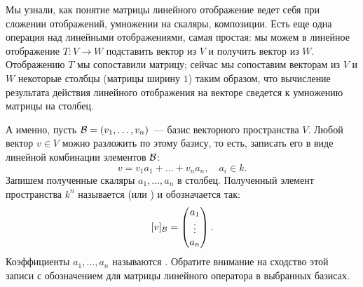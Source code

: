 Мы узнали, как понятие матрицы линейного отображение
ведет себя при сложении отображений, умножении на скаляры,
композиции. Есть еще одна операция над линейными
отображениями, самая простая: мы можем в линейное
отображение $T\colon V\to W$ подставить вектор из
$V$ и получить вектор из $W$.
Отображению $T$ мы сопоставили матрицу; сейчас мы сопоставим
векторам из $V$ и $W$ некоторые столбцы (матрицы ширину $1$)
таким образом, что вычисление результата действия
линейного отображения на векторе сведется к умножению
матрицы на столбец.

А именно, пусть $\mathcal B = (v_1,\dots,v_n)$~--- базис
векторного пространства $V$.
Любой вектор $v\in V$ можно разложить по этому базису,
то есть, записать его в виде линейной комбинации
элементов $\mathcal B$:
$$
v = v_1a_1+\dots+v_na_n,\quad a_i\in k.
$$
Запишем полученные скаляры $a_1,\dots,a_n$
в столбец. Полученный элемент пространства
$k^n$ называется 
(или )
 и обозначается так:
$$
[v]_{\mathcal B} = \begin{pmatrix} a_1 \\ \vdots \\ a_n\end{pmatrix}.
$$
Коэффициенты $a_1,\dots,a_n$ называются
.
Обратите внимание на сходство этой записи с обозначением
для матрицы линейного оператора в выбранных базисах.

